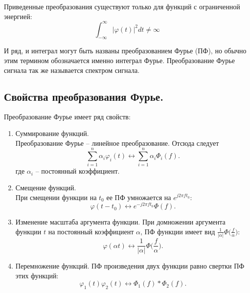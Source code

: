 \documentclass[a4paper,14pt]{extarticle}
\begin{document}
Приведенные преобразования существуют только для функций с ограниченной энергией:
\begin{equation*}
\int_{-\infty}^{\infty} |\varphi (t)|^2 dt \neq \infty
\end{equation*}

И ряд, и интеграл могут быть названы преобразованием Фурье (ПФ), но обычно этим термином обозначается именно интеграл Фурье. Преобразование Фурье сигнала так же называется спектром сигнала.

\subsection{Свойства преобразования Фурье.}

Преобразование Фурье имеет ряд свойств:

\begin{enumerate}

\item Суммирование функций. \\ Преобразование Фурье -- линейное преобразование. Отсюда следует 
\begin{equation*}
\sum_{i=1}^n \alpha_i \varphi_i (t) \leftrightarrow  \sum_{i=1}^n \alpha_i \Phi_i (f).
\end{equation*}   
где $\alpha_i$ -- постоянный коэффициент.

\item Смещение функций. \\ При смещении функции на $t_0$ ее ПФ умножается на $e^{j 2 \pi f t_0}$:
\begin{equation*}
\varphi (t - t_0) \leftrightarrow e^{-j 2 \pi f t_0} \Phi (f).
\end{equation*}

\item Изменение масштаба аргумента функции.
При домножении аргумента функции $t$ на постоянный коэффициент $\alpha$, ПФ функции имеет вид $\frac{1}{|\alpha|} \Phi \big(\frac{f}{\alpha}\big)$:
\begin{equation*}
\varphi(\alpha t) \leftrightarrow \frac{1}{|\alpha|} \Phi \bigg(\frac{f}{\alpha}\bigg).
\end{equation*}

\item Перемножение функций.  ПФ произведения двух функции равно свертки ПФ этих функций:
\begin{equation*}
\varphi_1 (t) \varphi_2 (t) \leftrightarrow \Phi_1(f) * \Phi_2(f). 
\end{equation*}


\end{enumerate}
\end{document}
